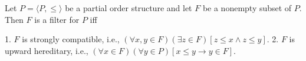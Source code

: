 Let $P = \langle P, \leq \rangle$ be a partial order structure and let $F$ be a nonempty subset of $P$. Then $F$ is a filter for $P$ iff

1. $F$ is strongly compatible, i.e., $(\forall x, y \in F)(\exists z \in F)[z \leq x \wedge z \leq y]$.
2. $F$ is upward hereditary, i.e., $(\forall x \in F)(\forall y \in P)[x \leq y \rightarrow y \in F]$.
